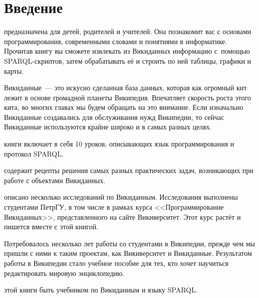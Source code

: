\chapter*{Введение}
\label{ch:intro}

 предназначена для детей, родителей и учителей. 
Она познакомит вас с основами программирования, современными словами и понятиями в информатике. 
Прочитав книгу вы сможете извлекать из Викиданных информацию с~помощью SPARQL-скриптов, 
затем обрабатывать её и строить по ней таблицы, графики и карты.

Викиданные~--- это искусно сделанная база данных, которая как огромный кит лежит в основе громадной планеты Википедия. Впечатляет скорость роста этого кита, во многих главах мы будем обращать на это внимание.
Если изначально Викиданные создавались %
для обслуживания нужд Википедии, 
то сейчас Викиданные используются крайне широко и в самых разных целях.

 книги включает в себя 10 уроков, описывающих язык программирования и протокол SPARQL.

 содержит рецепты решения самых разных практических задач, 
возникающих при работе с объектами Викиданных.

 описано несколько исследований по Викиданным. 
Исследования выполнены студентами ПетрГУ, в том числе в рамках курса <<Программирование Викиданных>>, 
представленного на сайте Викиверситет. 
Этот курс растёт и пишется вместе с этой книгой. 

Потребовалось несколько лет работы со студентами в Википедии, прежде чем мы пришли с ними к таким проектам, 
как Викиверситет и Викиданные. Результатом работы в Википедии стало учебное пособие для тех, 
кто хочет научиться редактировать мировую энциклопедию\cite{Krizhanovsky2015}.


 этой книги быть учебником по Викиданным и языку SPARQL.


